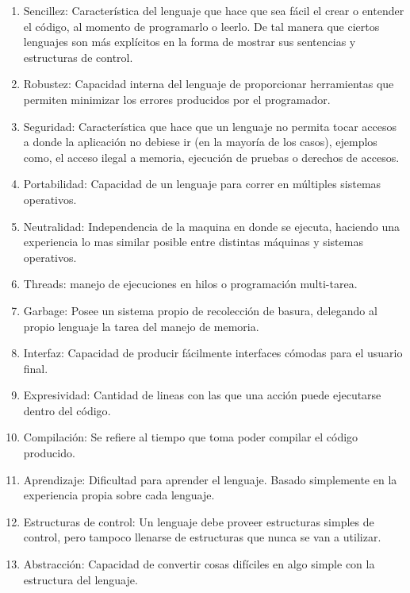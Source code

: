 \documentclass[a4paper,12pt,openany,oneside]{book}
\begin{document}
\begin{enumerate}

\item Sencillez: Característica del lenguaje que hace que sea fácil el crear o entender el código, al momento de programarlo o leerlo. De tal manera que ciertos lenguajes son más explícitos en la forma de mostrar sus sentencias y estructuras de control\cite{data4}.

\item Robustez: Capacidad interna del lenguaje de proporcionar herramientas que permiten minimizar los errores producidos por el programador\cite{data4}.

\item Seguridad: Característica que hace que un lenguaje no permita tocar accesos a donde la aplicación no debiese ir (en la mayoría de los casos), ejemplos como, el acceso ilegal a memoria, ejecución de pruebas o derechos de accesos\cite{data4}.

\item Portabilidad: Capacidad de un lenguaje para correr en múltiples sistemas operativos\cite{data4}.

\item Neutralidad: Independencia de la maquina en donde se ejecuta, haciendo una experiencia lo mas similar posible entre distintas máquinas y sistemas operativos\cite{data4}.

\item Threads: manejo de ejecuciones en hilos o programación multi-tarea\cite{data4}.

\item Garbage: Posee un sistema propio de recolección de basura, delegando al propio lenguaje la tarea del manejo de memoria\cite{data4}.

\item Interfaz: Capacidad de producir fácilmente interfaces cómodas para el usuario final\cite{data4}.

\item Expresividad: Cantidad de lineas con las que una acción puede ejecutarse dentro del código\cite{data5}.

\item Compilación: Se refiere al tiempo que toma poder compilar el código producido.

\item Aprendizaje: Dificultad para aprender el lenguaje. Basado simplemente en la experiencia propia sobre cada lenguaje.

\item Estructuras de control: Un lenguaje debe proveer estructuras simples de control, pero tampoco llenarse de estructuras que nunca se van a utilizar\cite{data6}.

\item Abstracción: Capacidad de convertir cosas difíciles en algo simple con la estructura del lenguaje\cite{data6}.

\end{enumerate}
\end{document}
